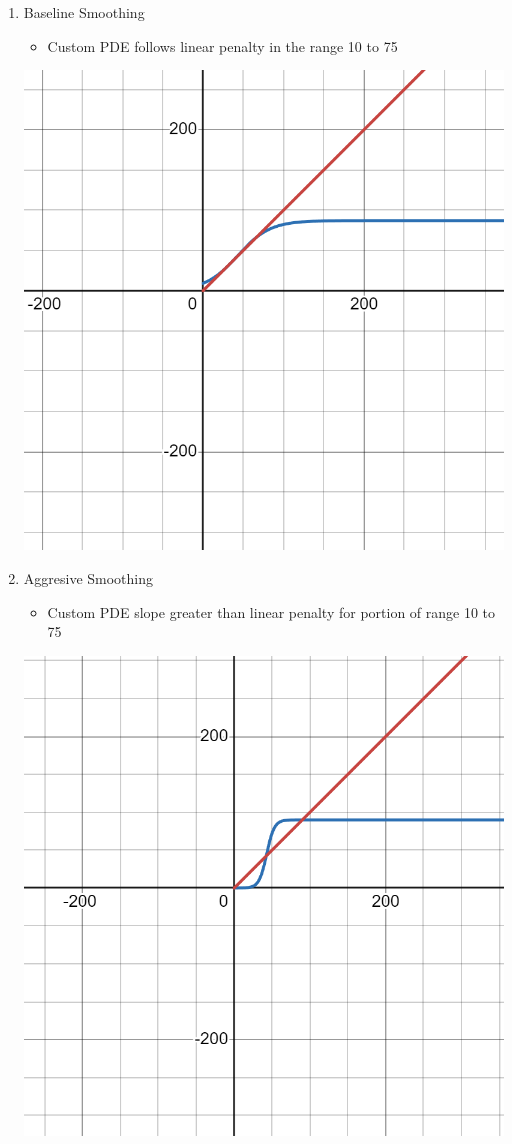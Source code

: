 \documentclass{article}
\begin{document}
  \begin{enumerate}
    \item Baseline Smoothing
      \begin{itemize}
        \item Custom PDE follows linear penalty in the range 10 to 75
      \end{itemize}
      \includegraphics[scale=0.1]{../report_images/baseline_smoothing.png}

    \item Aggresive Smoothing
      \begin{itemize}
        \item Custom PDE slope greater than linear penalty for portion of range 10 to 75
      \end{itemize}
      \includegraphics[scale=0.1]{../report_images/aggressive_smoothing.png}


\end{enumerate}
\end{document}
